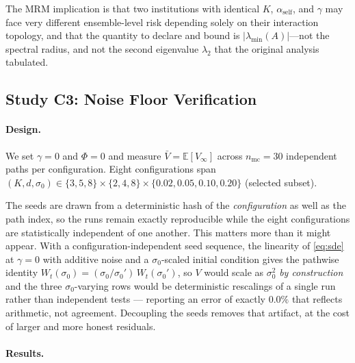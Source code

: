 \documentclass[12pt]{article}
\theoremstyle{plain}
\theoremstyle{definition}
\newcommand{\E}{\mathbb{E}}
\newcommand{\abs}[1]{\left| #1 \right|}
\begin{document}
The MRM
implication is that two institutions with identical $K$,
$\alpha_{\mathrm{self}}$, and $\gamma$ may face very different ensemble-level risk
depending solely on their interaction topology, and that the
quantity to declare and bound is $\abs{\lambda_{\min}(A)}$---not the
spectral radius, and not the second eigenvalue $\lambda_2$ that the original
analysis tabulated.

\subsection{Study C3: Noise Floor Verification}

\paragraph{Design.}
We set $\gamma = 0$ and $\Phi = 0$ and measure
$\bar V = \E[V_\infty]$ across $n_{\mathrm{mc}} = 30$ independent
paths per configuration.  Eight configurations span
$(K, d, \sigma_0) \in \{3,5,8\} \times \{2,4,8\} \times \{0.02, 0.05, 0.10, 0.20\}$
(selected subset).

The seeds are drawn from a deterministic hash of the \emph{configuration} as well as the path
index, so the runs remain exactly reproducible while the eight configurations are statistically
independent of one another.  This matters more than it might appear.  With a configuration-independent
seed sequence, the linearity of \eqref{eq:sde} at $\gamma=0$ with additive noise and a
$\sigma_0$-scaled initial condition gives the pathwise identity
$W_t(\sigma_0) = (\sigma_0/\sigma_0')\,W_t(\sigma_0')$, so $V$ would scale as $\sigma_0^2$
\emph{by construction} and the three $\sigma_0$-varying rows would be deterministic rescalings of a
single run rather than independent tests --- reporting an error of exactly $0.0\%$ that reflects
arithmetic, not agreement.  Decoupling the seeds removes that artifact, at the cost of larger and
more honest residuals.

\paragraph{Results.}
\end{document}
